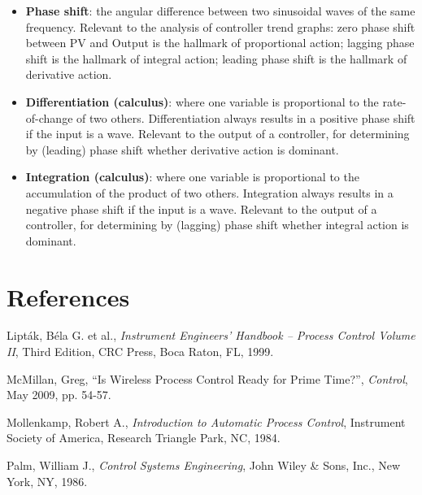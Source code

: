 \begin{itemize}
\item \textbf{Phase shift}: the angular difference between two sinusoidal waves of the same frequency.  Relevant to the analysis of controller trend graphs: zero phase shift between PV and Output is the hallmark of proportional action; lagging phase shift is the hallmark of integral action; leading phase shift is the hallmark of derivative action.
\item \textbf{Differentiation (calculus)}: where one variable is proportional to the rate-of-change of two others.  Differentiation always results in a positive phase shift if the input is a wave.  Relevant to the output of a controller, for determining by (leading) phase shift whether derivative action is dominant.
\item \textbf{Integration (calculus)}: where one variable is proportional to the accumulation of the product of two others.  Integration always results in a negative phase shift if the input is a wave.  Relevant to the output of a controller, for determining by (lagging) phase shift whether integral action is dominant.
\end{itemize}






\filbreak
\section*{References}



\noindent
Lipt\'ak, B\'ela G. et al., \textit{Instrument Engineers' Handbook -- Process Control Volume II}, Third Edition, CRC Press, Boca Raton, FL, 1999.

\vskip 10pt

\noindent
McMillan, Greg, ``Is Wireless Process Control Ready for Prime Time?'', \textit{Control}, May 2009, pp. 54-57. 

\vskip 10pt

\noindent
Mollenkamp, Robert A., \textit{Introduction to Automatic Process Control}, Instrument Society of America, Research Triangle Park, NC, 1984. 

\vskip 10pt

\noindent
Palm, William J., \textit{Control Systems Engineering}, John Wiley \& Sons, Inc., New York, NY, 1986. 

